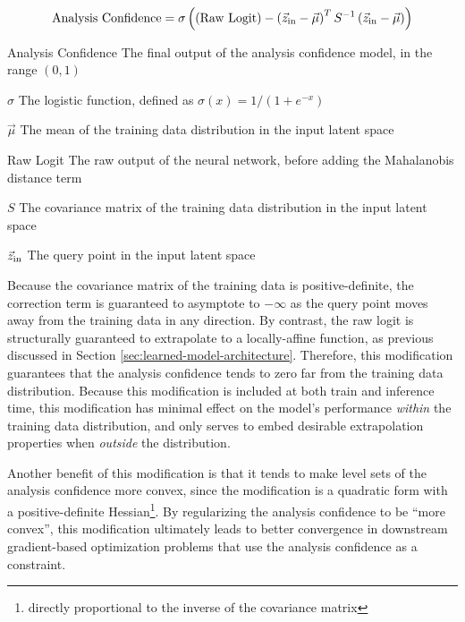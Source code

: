 \documentclass[journal]{new-aiaa}
\begin{document}
\begin{equation}
    \text{Analysis Confidence} = \sigma
    \left(
    \left(\text{Raw Logit}\right) -
    \left( \vec{z}_{\rm in} - \vec\mu \right) ^ T
    S ^{-1}
    \left( \vec{z}_{\rm in} - \vec\mu \right)
    \right)
    \label{eq:uq}
\end{equation}

\begin{eqexpl}[30mm]
    \item{Analysis Confidence} The final output of the analysis confidence model, in the range $(0, 1)$
    \item{$\sigma$} The logistic function, defined as $\sigma(x) = 1 / (1 + e^{-x})$
    \item{$\vec\mu$} The mean of the training data distribution in the input latent space
    \item{Raw Logit} The raw output of the neural network, before adding the Mahalanobis distance term
    \item{$S$} The covariance matrix of the training data distribution in the input latent space
    \item{$\vec{z}_{\rm in}$} The query point in the input latent space
\end{eqexpl}

Because the covariance matrix of the training data is positive-definite, the correction term is guaranteed to asymptote to $-\infty$ as the query point moves away from the training data in any direction. By contrast, the raw logit is structurally guaranteed to extrapolate to a locally-affine function, as previous discussed in Section \ref{sec:learned-model-architecture}. Therefore, this modification guarantees that the analysis confidence tends to zero far from the training data distribution. Because this modification is included at both train and inference time, this modification has minimal effect on the model's performance \textit{within} the training data distribution, and only serves to embed desirable extrapolation properties when \textit{outside} the distribution.

Another benefit of this modification is that it tends to make level sets of the analysis confidence more convex, since the modification is a quadratic form with a positive-definite Hessian\footnote{directly proportional to the inverse of the covariance matrix}. By regularizing the analysis confidence to be ``more convex'', this modification ultimately leads to better convergence in downstream gradient-based optimization problems that use the analysis confidence as a constraint.
\end{document}
